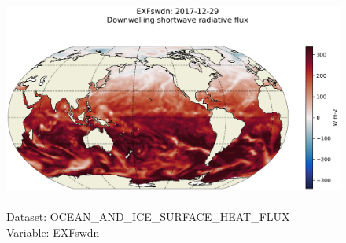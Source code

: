 \begin{figure}[H]
\centering
\includegraphics[scale=0.5]{../images/plots/latlon_plots/Ocean_and_Sea-Ice_Surface_Heat_Fluxes/EXFswdn.png}
\caption{\\Dataset: OCEAN\_AND\_ICE\_SURFACE\_HEAT\_FLUX\\Variable: EXFswdn}
\label{tab:table-OCEAN_AND_ICE_SURFACE_HEAT_FLUX_EXFswdn-Plot}
\end{figure}
\pagebreak
